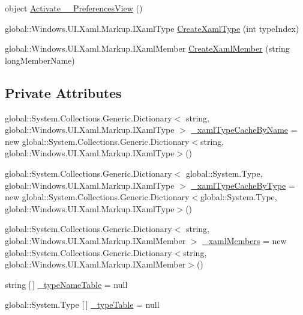 \begin{DoxyCompactItemize}
\item 
object \hyperlink{class_eli_log_in_app_1_1_eli_log_in_app___xaml_type_info_1_1_xaml_type_info_provider_a9d824bf7047ee59b79e8d12eac141273}{Activate\+\_\+\_\+\+Preferences\+View} ()
\item 
global\+::\+Windows.\+U\+I.\+Xaml.\+Markup.\+I\+Xaml\+Type \hyperlink{class_eli_log_in_app_1_1_eli_log_in_app___xaml_type_info_1_1_xaml_type_info_provider_ab81d867444ab14bd51b63aba4089901b}{Create\+Xaml\+Type} (int type\+Index)
\item 
global\+::\+Windows.\+U\+I.\+Xaml.\+Markup.\+I\+Xaml\+Member \hyperlink{class_eli_log_in_app_1_1_eli_log_in_app___xaml_type_info_1_1_xaml_type_info_provider_a8e9162d3ca590994cc68dcf8f94ffad2}{Create\+Xaml\+Member} (string long\+Member\+Name)
\end{DoxyCompactItemize}
\subsection*{Private Attributes}
\begin{DoxyCompactItemize}
\item 
global\+::\+System.\+Collections.\+Generic.\+Dictionary$<$ string, global\+::\+Windows.\+U\+I.\+Xaml.\+Markup.\+I\+Xaml\+Type $>$ \hyperlink{class_eli_log_in_app_1_1_eli_log_in_app___xaml_type_info_1_1_xaml_type_info_provider_af66d073b25daacb75eeecbbab447653b}{\+\_\+xaml\+Type\+Cache\+By\+Name} = new global\+::\+System.\+Collections.\+Generic.\+Dictionary$<$string, global\+::\+Windows.\+U\+I.\+Xaml.\+Markup.\+I\+Xaml\+Type$>$()
\item 
global\+::\+System.\+Collections.\+Generic.\+Dictionary$<$ global\+::\+System.\+Type, global\+::\+Windows.\+U\+I.\+Xaml.\+Markup.\+I\+Xaml\+Type $>$ \hyperlink{class_eli_log_in_app_1_1_eli_log_in_app___xaml_type_info_1_1_xaml_type_info_provider_a433a09da46883bcad8c12c74d16e5b84}{\+\_\+xaml\+Type\+Cache\+By\+Type} = new global\+::\+System.\+Collections.\+Generic.\+Dictionary$<$global\+::\+System.\+Type, global\+::\+Windows.\+U\+I.\+Xaml.\+Markup.\+I\+Xaml\+Type$>$()
\item 
global\+::\+System.\+Collections.\+Generic.\+Dictionary$<$ string, global\+::\+Windows.\+U\+I.\+Xaml.\+Markup.\+I\+Xaml\+Member $>$ \hyperlink{class_eli_log_in_app_1_1_eli_log_in_app___xaml_type_info_1_1_xaml_type_info_provider_a0a4369ddaa3aee2bc2b9f0caf17f266f}{\+\_\+xaml\+Members} = new global\+::\+System.\+Collections.\+Generic.\+Dictionary$<$string, global\+::\+Windows.\+U\+I.\+Xaml.\+Markup.\+I\+Xaml\+Member$>$()
\item 
string \mbox{[}$\,$\mbox{]} \hyperlink{class_eli_log_in_app_1_1_eli_log_in_app___xaml_type_info_1_1_xaml_type_info_provider_a4aa98443c8ce61ac15757eeb22236eca}{\+\_\+type\+Name\+Table} = null
\item 
global\+::\+System.\+Type \mbox{[}$\,$\mbox{]} \hyperlink{class_eli_log_in_app_1_1_eli_log_in_app___xaml_type_info_1_1_xaml_type_info_provider_ab37555ca7891a20a58deff774e2a3237}{\+\_\+type\+Table} = null
\end{DoxyCompactItemize}


